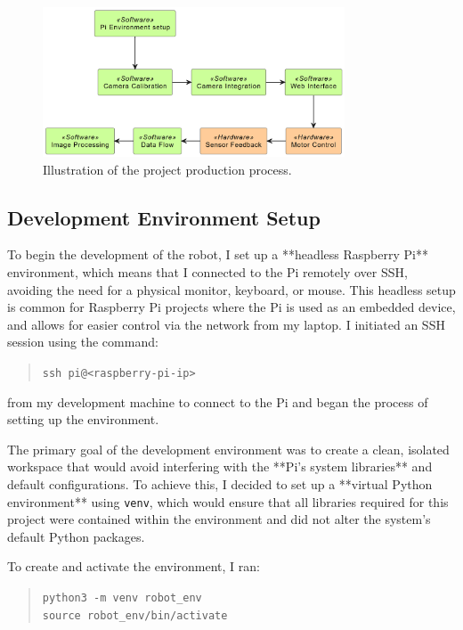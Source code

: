 \begin{figure}[H]
	\centering
	
	\centering
	\includegraphics[width=0.8\textwidth]{ch4/figs/hi.png}
	\caption{Illustration of the project production process.}
	\label{fig:moto}
\end{figure}

\subsection{Development Environment Setup}

To begin the development of the robot, I set up a **headless Raspberry Pi** environment, which means that I connected to the Pi remotely over SSH, avoiding the need for a physical monitor, keyboard, or mouse. This headless setup is common for Raspberry Pi projects where the Pi is used as an embedded device, and allows for easier control via the network from my laptop. I initiated an SSH session using the command:

\begin{quote}
	\texttt{ssh pi@<raspberry-pi-ip>}
\end{quote}

from my development machine to connect to the Pi and began the process of setting up the environment.

The primary goal of the development environment was to create a clean, isolated workspace that would avoid interfering with the **Pi’s system libraries** and default configurations. To achieve this, I decided to set up a **virtual Python environment** using \texttt{venv}, which would ensure that all libraries required for this project were contained within the environment and did not alter the system’s default Python packages.

To create and activate the environment, I ran:

\begin{quote}
	\texttt{python3 -m venv robot\_env} \\
	\texttt{source robot\_env/bin/activate}
\end{quote}

